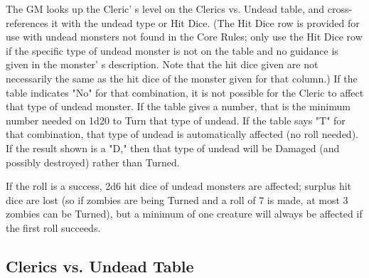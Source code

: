 \documentclass[a4paper,twoside,openany,10pt]{book}
\begin{document}
\begin{multicols}{2}
The GM looks up the Cleric' s level on the Clerics vs. Undead table, and cross-references it with the undead type or Hit Dice. (The Hit Dice row is provided for use with undead monsters not found in the Core Rules; only use the Hit Dice row if the specific type of undead monster is not on the table and no guidance is given in the monster' s description. Note that the hit dice given are not necessarily the same as the hit dice of the monster given for that column.) If the table indicates "No" for that combination, it is not possible for the Cleric to affect that type of undead monster. If the table gives a number, that is the minimum number needed on 1d20 to Turn that type of undead. If the table says "T" for that combination, that type of undead is automatically affected (no roll needed). If the result shown is a "D," then that type of undead will be Damaged (and possibly destroyed) rather than Turned.

If the roll is a success, 2d6 hit dice of undead monsters are affected; surplus hit dice are lost (so if zombies are being Turned and a roll of 7 is made, at most 3 zombies can be Turned), but a minimum of one creature will always be affected if the first roll succeeds.

\end{multicols}

\subsection{Clerics vs. Undead Table}
\end{document}
